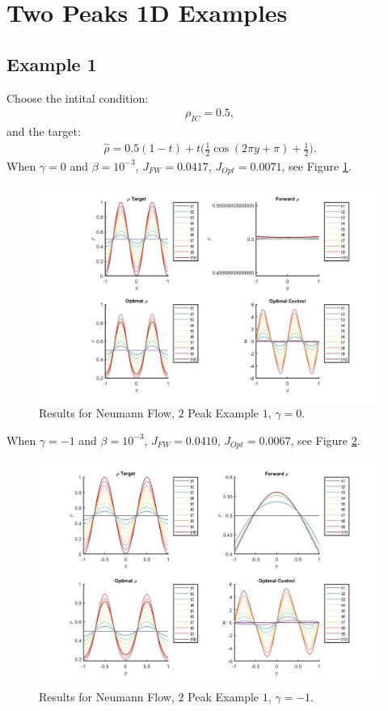 \documentclass[11pt, a4paper]{article}
\theoremstyle{definition}
\begin{document}
\section{Two Peaks 1D Examples}
\subsection{Example 1}
Choose the intital condition:
\begin{align*}
\rho_{IC} = 0.5,
\end{align*}
and the target:
\begin{align*}
\hat \rho = 0.5(1-t) + t\bigg(\frac{1}{2}\cos(2 \pi y + \pi) + \frac{1}{2}\bigg).
\end{align*}
When $\gamma = 0$ and $\beta = 10^{-3}$, $J_{FW} = 0.0417$, $J_{Opt} = 0.0071$, see Figure \ref{Ex12Peak1}.
\begin{figure}[h]
	\includegraphics[scale=0.3]{Res2Peak1.jpg}
	\caption{Results for Neumann Flow, $2$ Peak Example $1$, $\gamma = 0$.}
	\label{Ex12Peak1}
\end{figure}
When $\gamma = -1$ and $\beta = 10^{-3}$, $J_{FW} = 0.0410$, $J_{Opt} = 0.0067$, see Figure \ref{Ex12Peak1a}.
\begin{figure}[h]
	\includegraphics[scale=0.3]{Res2Peak1a.jpg}
	\caption{Results for Neumann Flow, $2$ Peak Example $1$, $\gamma = -1$.}
	\label{Ex12Peak1a}
\end{figure}
\end{document}
